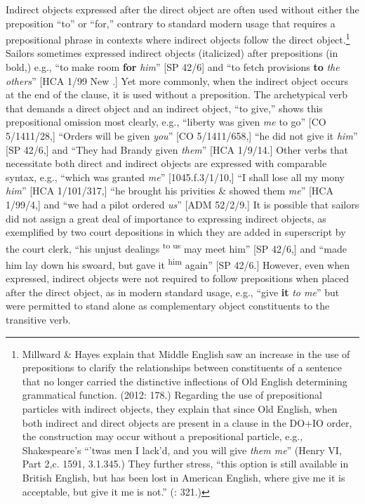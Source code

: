   Indirect objects expressed after the direct object are often used without either the preposition “to” or “for,” contrary to standard modern usage that requires a prepositional phrase in contexts where indirect objects follow the direct object.\footnote{Millward \& Hayes explain that Middle English saw an increase in the use of prepositions to clarify the relationships between constituents of a sentence that no longer carried the distinctive inflections of Old English determining grammatical function. (2012: 178.) Regarding the use of prepositional particles with indirect objects, they explain that since Old English, when both indirect and direct objects are present in a clause in the DO+IO order, the construction may occur without a prepositional particle, e.g., Shakespeare’s “’twas men I lack’d, and you will give \textit{them me}” (Henry VI, Part 2,c. 1591, 3.1.345.) They further stress, “this option is still available in British English, but has been lost in American English, where give me it is acceptable, but give it me is not.” (\citealt{MillwardHayes2012}: 321.)} Sailors sometimes expressed indirect objects (italicized) after prepositions (in bold,) e.g., “to make room \textbf{for} \textit{him}” [SP 42/6] and “to fetch provisions \textbf{to} \textit{the others}” [HCA 1/99 New \citealt{Providence1722}.] Yet more commonly, when the indirect object occurs at the end of the clause, it is used without a preposition. The archetypical verb that demands a direct object and an indirect object, “to give,” shows this prepositional omission most clearly, e.g., “liberty was given \textit{me} to go” [CO 5/1411/28,] “Orders will be given \textit{you}” [CO 5/1411/658,] “he did not give it \textit{him}” [SP 42/6,] and “They had Brandy given \textit{them}” [HCA 1/9/14.] Other verbs that necessitate both direct and indirect objects are expressed with comparable syntax, e.g., “which was granted \textit{me}” [1045.f.3/1/10,] “I shall lose all my mony \textit{him}” [HCA 1/101/317,] “he brought his privities \& showed them \textit{me}” [HCA 1/99/4,] and “we had a pilot ordered \textit{us}” [ADM 52/2/9.] It is possible that sailors did not assign a great deal of importance to expressing indirect objects, as exemplified by two court depositions in which they are added in superscript by the court clerk, “his unjust dealings \textsuperscript{to us} may meet him” [SP 42/6,] and “made him lay down his swoard, but gave it \textsuperscript{him} again” [SP 42/6.] However, even when expressed, indirect objects were not required to follow prepositions when placed after the direct object, as in modern standard usage, e.g., “give \textbf{it} \textit{to me}” but were permitted to stand alone as complementary object constituents to the transitive verb. 

